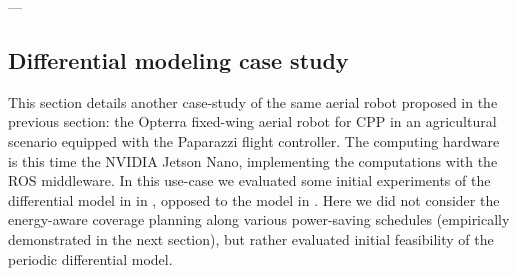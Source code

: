 ---


\subsection{Differential modeling case study}
\label{sec:res-diff}

This section details another case-study of the same aerial robot proposed in the previous section: the Opterra fixed-wing aerial robot for CPP in an agricultural scenario equipped with the Paparazzi flight controller. The computing hardware is this time the NVIDIA Jetson Nano, implementing the computations with the ROS middleware. In this use-case we evaluated some initial experiments of the differential model in  in , opposed to the model in . Here we did not consider the energy-aware coverage planning along various power-saving schedules (empirically demonstrated in the next section), but rather evaluated initial feasibility of the periodic differential model.  

